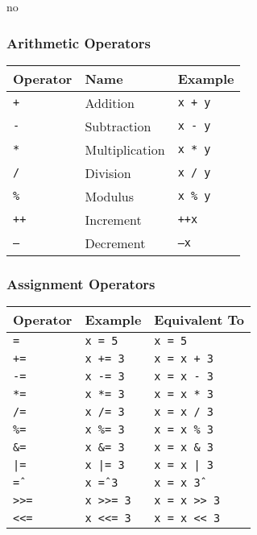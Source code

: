 no\documentclass{article}
\begin{document}
\subsubsection{Arithmetic Operators}
\begin{center}
\begin{tabular}{@{}lll@{}}
\toprule
\textbf{Operator} & \textbf{Name} & \textbf{Example} \\
\midrule
\texttt{+}  & Addition       & \texttt{x + y} \\
\texttt{-}  & Subtraction    & \texttt{x - y} \\
\texttt{*}  & Multiplication & \texttt{x * y} \\
\texttt{/}  & Division       & \texttt{x / y} \\
\texttt{\%} & Modulus        & \texttt{x \% y} \\
\texttt{++} & Increment      & \texttt{++x} \\
\texttt{--} & Decrement      & \texttt{--x} \\
\bottomrule
\end{tabular}
\end{center}

\vspace{1em}
\subsubsection{Assignment Operators}
\begin{center}
\begin{tabular}{@{}lll@{}}
\toprule
\textbf{Operator} & \textbf{Example} & \textbf{Equivalent To} \\
\midrule
\texttt{=}    & \texttt{x = 5}    & \texttt{x = 5} \\
\texttt{+=}   & \texttt{x += 3}   & \texttt{x = x + 3} \\
\texttt{-=}   & \texttt{x -= 3}   & \texttt{x = x - 3} \\
\texttt{*=}   & \texttt{x *= 3}   & \texttt{x = x * 3} \\
\texttt{/=}   & \texttt{x /= 3}   & \texttt{x = x / 3} \\
\texttt{\%=}  & \texttt{x \%= 3}  & \texttt{x = x \% 3} \\
\texttt{\&=}  & \texttt{x \&= 3}  & \texttt{x = x \& 3} \\
\texttt{|=}   & \texttt{x |= 3}   & \texttt{x = x | 3} \\
\texttt{\^=}  & \texttt{x \^= 3}  & \texttt{x = x \^ 3} \\
\texttt{>>=}  & \texttt{x >>= 3}  & \texttt{x = x >> 3} \\
\texttt{<<=}  & \texttt{x <<= 3}  & \texttt{x = x << 3} \\
\bottomrule
\end{tabular}
\end{center}
\end{document}

